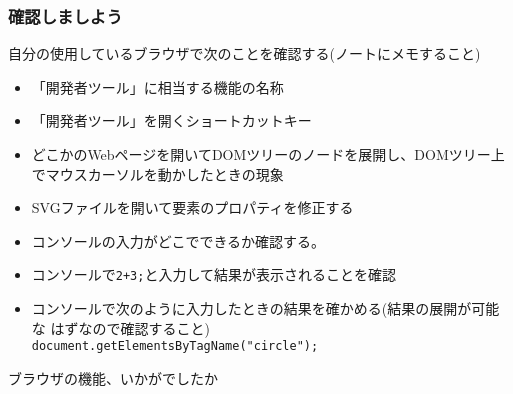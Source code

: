 \begin{frame}[containsverbatim]
 \frametitle{確認しましよう}
 自分の使用しているブラウザで次のことを確認する(ノートにメモすること)
 \begin{itemize}
  \item 「開発者ツール」に相当する機能の名称
  \item 「開発者ツール」を開くショートカットキー
  \item どこかのWebページを開いてDOMツリーのノードを展開し、DOMツリー上
        でマウスカーソルを動かしたときの現象
  \item SVGファイルを開いて要素のプロパティを修正する
  \item コンソールの入力がどこでできるか確認する。
  \item コンソールで\texttt{2+3;}と入力して結果が表示されることを確認
  \item コンソールで次のように入力したときの結果を確かめる(結果の展開が可能な
        はずなので確認すること)
\\
        \texttt{document.getElementsByTagName("circle");}
 \end{itemize}
 ブラウザの機能、いかがでしたか
 \end{frame}

\begin{frame}[containsverbatim]
 \frametitle{}
\end{frame}

